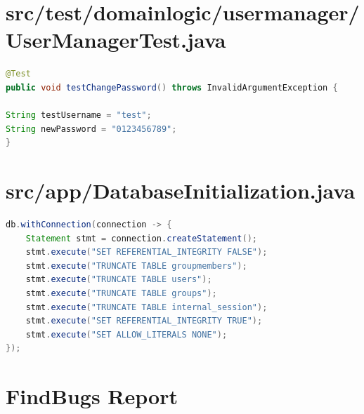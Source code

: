 \documentclass[12pt,DIV14,BCOR10mm,a4paper,twoside,parskip=half-,headsepline,headinclude,english,ngerman,bibliography=totocnumbered]{scrreprt}
\begin{document}
\begin{appendices}

\chapter{src/test/domainlogic/usermanager/UserManagerTest.java}
\begin{lstlisting}[language=Java,caption=Hardkodiertes Passwort in einem Test aus der Klasse \texttt{UserManagerTest},label={lst:staticanalysis-hardcoded-pw}]
@Test
public void testChangePassword() throws InvalidArgumentException {

String testUsername = "test";
String newPassword = "0123456789";
}
\end{lstlisting}

\chapter{src/app/DatabaseInitialization.java}
\begin{lstlisting}[language=Java,caption=Von SecureAssist gefundenes False Positive Beispiel fuer Query Injections,label={lst:staticanalysis-query-injection}]
db.withConnection(connection -> {
	Statement stmt = connection.createStatement();
	stmt.execute("SET REFERENTIAL_INTEGRITY FALSE");
	stmt.execute("TRUNCATE TABLE groupmembers");
	stmt.execute("TRUNCATE TABLE users");
	stmt.execute("TRUNCATE TABLE groups");
	stmt.execute("TRUNCATE TABLE internal_session");
	stmt.execute("SET REFERENTIAL_INTEGRITY TRUE");
	stmt.execute("SET ALLOW_LITERALS NONE");
});
\end{lstlisting}

\chapter{FindBugs Report}
\label{staticanalysis-find-bugs}
%

\end{appendices}
\end{document}
